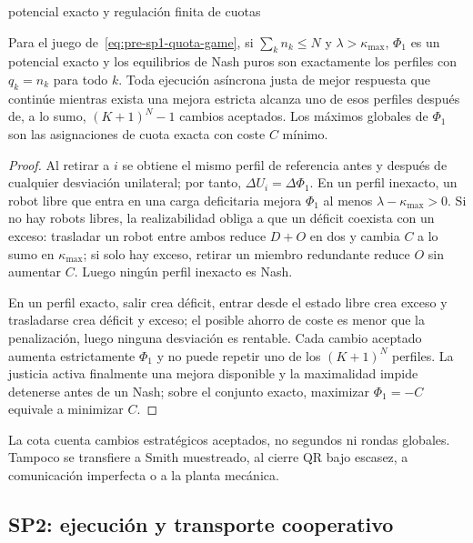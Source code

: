 \begin{contribucion}{potencial exacto y regulación finita de cuotas}
\begin{teorema}
\label{thm:pre-sp1-exact-quota}
Para el juego de~\eqref{eq:pre-sp1-quota-game}, si $\sum_kn_k\leq N$ y $\lambda>\kappa_{\max}$, $\Phi_1$ es un potencial exacto y los equilibrios de Nash puros son exactamente los perfiles con $q_k=n_k$ para todo $k$. Toda ejecución asíncrona justa de mejor respuesta que continúe mientras exista una mejora estricta alcanza uno de esos perfiles después de, a lo sumo, $(K+1)^N-1$ cambios aceptados. Los máximos globales de $\Phi_1$ son las asignaciones de cuota exacta con coste $C$ mínimo.
\end{teorema}
\begin{proof}
Al retirar a $i$ se obtiene el mismo perfil de referencia antes y después de cualquier desviación unilateral; por tanto, $\Delta U_i=\Delta\Phi_1$. En un perfil inexacto, un robot libre que entra en una carga deficitaria mejora $\Phi_1$ al menos $\lambda-\kappa_{\max}>0$. Si no hay robots libres, la realizabilidad obliga a que un déficit coexista con un exceso: trasladar un robot entre ambos reduce $D+O$ en dos y cambia $C$ a lo sumo en $\kappa_{\max}$; si solo hay exceso, retirar un miembro redundante reduce $O$ sin aumentar $C$. Luego ningún perfil inexacto es Nash.

En un perfil exacto, salir crea déficit, entrar desde el estado libre crea exceso y trasladarse crea déficit y exceso; el posible ahorro de coste es menor que la penalización, luego ninguna desviación es rentable. Cada cambio aceptado aumenta estrictamente $\Phi_1$ y no puede repetir uno de los $(K+1)^N$ perfiles. La justicia activa finalmente una mejora disponible y la maximalidad impide detenerse antes de un Nash; sobre el conjunto exacto, maximizar $\Phi_1=-C$ equivale a minimizar $C$.
\end{proof}
La cota cuenta cambios estratégicos aceptados, no segundos ni rondas globales. Tampoco se transfiere a Smith muestreado, al cierre QR bajo escasez, a comunicación imperfecta o a la planta mecánica.
\end{contribucion}




\clearpage
\subsection{SP2: ejecución y transporte cooperativo}
\label{subsec:sp2}

